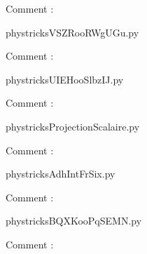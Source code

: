     Comment : 

    \clearpage
    


    \newcommand{\CaptionFigVSZRooRWgUGu}{<+Type your caption here+>}
    \begin{center}
        
    \end{center}
    phystricksVSZRooRWgUGu.py

    Comment : 

    \clearpage
    


    \newcommand{\CaptionFigUIEHooSlbzIJ}{<+Type your caption here+>}
    \begin{center}
        
    \end{center}
    phystricksUIEHooSlbzIJ.py

    Comment : 

    \clearpage
    


    \newcommand{\CaptionFigProjectionScalaire}{<+Type your caption here+>}
    \begin{center}
        
    \end{center}
    phystricksProjectionScalaire.py

    Comment : 

    \clearpage
    


    \newcommand{\CaptionFigAdhIntFrSix}{<+Type your caption here+>}
    \begin{center}
        
    \end{center}
    phystricksAdhIntFrSix.py

    Comment : 

    \clearpage
    


    \newcommand{\CaptionFigBQXKooPqSEMN}{<+Type your caption here+>}
    \begin{center}
        
    \end{center}
    phystricksBQXKooPqSEMN.py

    Comment : 

